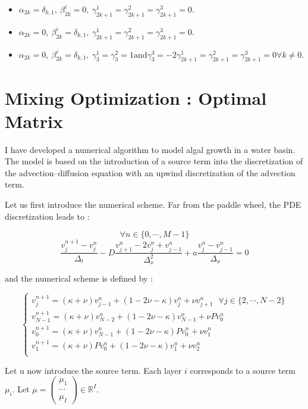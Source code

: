 \documentclass{article}
\begin{document}
\begin{itemize}
    \item  $\alpha_{2k} = \delta_{k, 1}, \ \beta_{2k}^i = 0, \ \gamma_{2k+1}^1 = \gamma_{2k+1}^2 = \gamma_{2k+1}^3 = 0$.
    \item  $\alpha_{2k} = 0, \ \beta_{2k}^i = \delta_{k, 1}, \ \gamma_{2k+1}^1 = \gamma_{2k+1}^2 = \gamma_{2k+1}^3 = 0$.
    \item  $\alpha_{2k} = 0, \ \beta_{2k}^i = \delta_{k, 1}, \  \gamma_{3}^1 = \gamma_{3}^2 = 1 \text{and} \gamma_{3}^3 = -2\gamma_{2k+1}^1 = \gamma_{2k+1}^2 = \gamma_{2k+1}^3 = 0 \forall k \neq 0$.
\end{itemize}

\section{Mixing Optimization : Optimal Matrix}

I have developed a numerical algorithm to model algal growth in a water basin. 
The model is based on the introduction of a source term into the discretization of the advection--diffusion equation with an upwind discretization of the advection term. 

Let us first introduce the numerical scheme.
Far from the paddle wheel, the PDE discretization leads to :

\[\forall n \in \{0, \cdots, M-1\}\]
\[\frac{v_j^{n+1} - v_j^n}{\Delta_t} - D\frac{v_{j+1}^n - 2v_{j}^n + v_{j-1}^n}{\Delta_x^2} + a\frac{v_j^n - v_{j-1}^n}{\Delta_x} = 0\]

and the numerical scheme is defined by :

\[\begin{cases}
    v_j^{n+1} = (\kappa + \nu)v_{j-1}^n+ (1 - 2\nu - \kappa)v_j^n + \nu v_{j+1}^n \ \ \ \forall j \in \{2, \cdots, N-2\}\\
    v_{N-1}^{n+1} = (\kappa + \nu)v_{N-2}^n+ (1 - 2\nu - \kappa)v_{N-1}^n + \nu P v_{0}^n \\
    v_{0}^{n+1} = (\kappa + \nu)v_{N-1}^n+ (1 - 2\nu - \kappa)P v_0^n + \nu v_{1}^n \\
    v_{1}^{n+1} = (\kappa + \nu)P v_{0}^n+ (1 - 2\nu - \kappa)v_1^n + \nu v_{2}^n\\  
\end{cases} \]

Let u now introduce the source term. Each layer $i$ corresponds to a source term $\mu_i$. Let $\mu = \begin{pmatrix}
\mu_1 \\ \cdots \\ \mu_I
\end{pmatrix}\in \mathbb{R}^I$.
\end{document}
